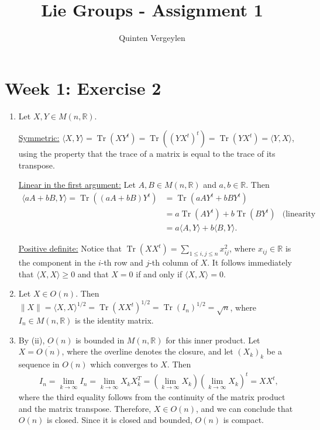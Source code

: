\documentclass{article}
\title{Lie Groups - Assignment 1}
\author{Quinten Vergeylen}
\date{}
\DeclareMathOperator{\Tr}{Tr}
\newcommand{\bb}{\mathbb}
\theoremstyle{remark}
\begin{document}
\maketitle
{}

\section*{Week 1: Exercise 2}
\begin{enumerate}[label=(\roman*)]
    \item Let $X,Y \in M(n,\bb{R})$.
    
    \underline{Symmetric:} $\langle X, Y \rangle = \Tr(XY^t) = \Tr((YX^t)^t) = \Tr(YX^t) = \langle Y,X \rangle$, using the property that the trace of a matrix is equal to the trace of its transpose.

    \underline{Linear in the first argument:} Let $A,B \in M(n,\bb{R})$ and $a,b \in \bb{R}$. Then
    \begin{align*}
        \langle aA+bB, Y \rangle = \Tr((aA + bB)Y^t) &= \Tr(aAY^t + bBY^t) \\
        &= a \Tr(AY^t) + b\Tr(BY^t) &\text{(linearity of trace)} \\
        &= a\langle A, Y \rangle + b \langle B, Y \rangle.
    \end{align*}

    \underline{Positive definite:} Notice that $\Tr(XX^t) = \sum_{1\leq i,j \leq n} x_{ij}^2$, where $x_{ij} \in \bb{R}$ is the component in the $i$-th row and $j$-th column of $X$. It follows immediately that $\langle X, X \rangle \geq 0$ and that $X = 0$ if and only if $\langle X, X\rangle = 0$.

    \item Let $X \in O(n)$. Then $\lVert X \rVert = \langle X,X \rangle^{1/2} = \Tr(XX^t)^{1/2} = \Tr(I_n)^{1/2} = \sqrt{n}$, where $I_n \in M(n,\bb{R})$ is the identity matrix.
    
    \item By (ii), $O(n)$ is bounded in $M(n,\bb{R})$ for this inner product. Let $X = \overline{O(n)}$, where the overline denotes the closure, and let $(X_k)_k$ be a sequence in $O(n)$ which converges to $X$. Then
    \begin{align*}
        I_n = \lim_{k\to\infty} I_n = \lim_{k\to\infty} X_k X_k^T = (\lim_{k\to\infty} X_k)(\lim_{k\to\infty} X_k)^t = XX^t,
    \end{align*}
    where the third equality follows from the continuity of the matrix product and the matrix transpose. Therefore, $X \in O(n)$, and we can conclude that $O(n)$ is closed. Since it is closed and bounded, $O(n)$ is compact.
\end{enumerate}
\end{document}
